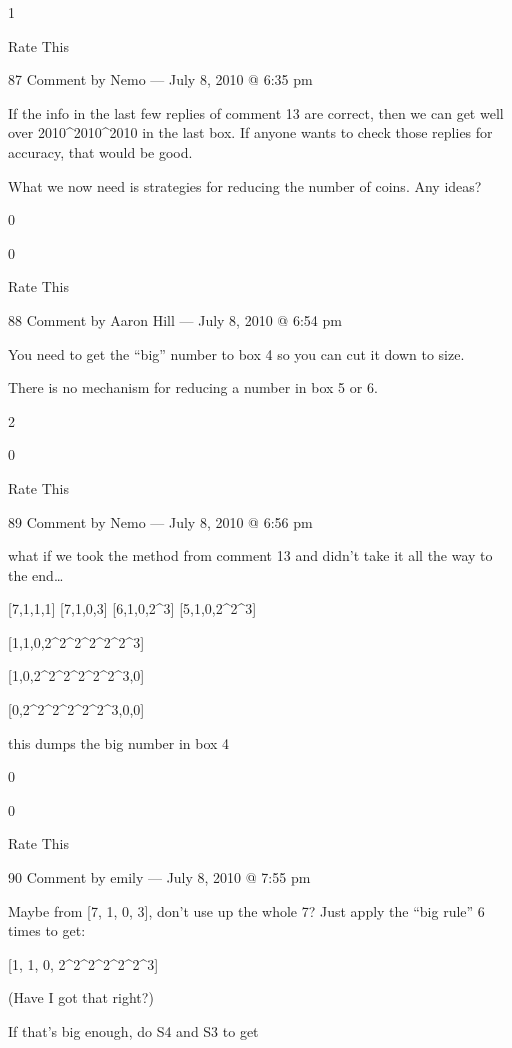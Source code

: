 {    1
     
    Rate This

    87 Comment by Nemo — July 8, 2010 @ 6:35 pm

    If the info in the last few replies of comment 13 are correct,
    then we can get well over 2010^2010^2010 in the last box. If
    anyone wants to check those replies for accuracy, that would be
    good.

    What we now need is strategies for reducing the number of
    coins. Any ideas?
     
    0
     
    0
     
    Rate This

    88 Comment by Aaron Hill — July 8, 2010 @ 6:54 pm

        You need to get the “big” number to box 4 so you can cut it down to size.

        There is no mechanism for reducing a number in box 5 or 6.
         
        2
         
        0
         
        Rate This

        89 Comment by Nemo — July 8, 2010 @ 6:56 pm

            what if we took the method from comment 13 and didn’t take it all the way to the end…

            [7,1,1,1]
            [7,1,0,3]
            [6,1,0,2^3]
            [5,1,0,2^2^3]

            [1,1,0,2^2^2^2^2^2^3]

            [1,0,2^2^2^2^2^2^3,0]

            [0,2^2^2^2^2^2^3,0,0]

            this dumps the big number in box 4
             
            0
             
            0
             
            Rate This

            90 Comment by emily — July 8, 2010 @ 7:55 pm

        Maybe from [7, 1, 0, 3], don’t use up the whole 7? Just apply the “big rule” 6 times to get:

        [1, 1, 0, 2^2^2^2^2^2^3]

        (Have I got that right?)

        If that’s big enough, do S4 and S3 to get

}
